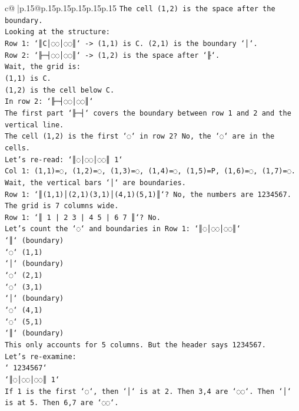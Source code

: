 \documentclass{article}
\begin{document}
{\begin{supertabular}{c@{$\;$}|p{.15\linewidth}@{}p{.15\linewidth}p{.15\linewidth}p{.15\linewidth}p{.15\linewidth}p{.15\linewidth}}
{{{\texttt{The cell (1,2) is the space after the boundary.} \\
\texttt{Looking at the structure:} \\
\texttt{Row 1: `║C│◌◌│◌◌║` {-}> (1,1) is C. (2,1) is the boundary `│`.} \\
\texttt{Row 2: `╟─┤◌◌│◌◌║` {-}> (1,2) is the space after `╟`.} \\
\texttt{Wait, the grid is:} \\
\texttt{(1,1) is C.} \\
\texttt{(1,2) is the cell below C.} \\
\texttt{In row 2: `╟─┤◌◌│◌◌║`} \\
\texttt{The first part `╟─┤` covers the boundary between row 1 and 2 and the vertical line.} \\
\texttt{The cell (1,2) is the first `◌` in row 2? No, the `◌` are in the cells.} \\
\texttt{Let's re{-}read: `║◌│◌◌│◌◌║ 1`} \\
\texttt{Col 1: (1,1)=◌, (1,2)=◌, (1,3)=◌, (1,4)=◌, (1,5)=P, (1,6)=◌, (1,7)=◌.} \\
\texttt{Wait, the vertical bars `│` are boundaries.} \\
\texttt{Row 1: `║(1,1)│(2,1)(3,1)│(4,1)(5,1)║`? No, the numbers are 1234567.} \\
\texttt{The grid is 7 columns wide.} \\
\texttt{Row 1: `║ 1 | 2 3 | 4 5 | 6 7 ║`? No.} \\
\texttt{Let's count the `◌` and boundaries in Row 1: `║◌│◌◌│◌◌║`} \\
\texttt{`║` (boundary)} \\
\texttt{`◌` (1,1)} \\
\texttt{`│` (boundary)} \\
\texttt{`◌` (2,1)} \\
\texttt{`◌` (3,1)} \\
\texttt{`│` (boundary)} \\
\texttt{`◌` (4,1)} \\
\texttt{`◌` (5,1)} \\
\texttt{`║` (boundary)} \\
\texttt{This only accounts for 5 columns. But the header says 1234567.} \\
\texttt{Let's re{-}examine:} \\
\texttt{` 1234567`} \\
\texttt{`║◌│◌◌│◌◌║ 1`} \\
\texttt{If 1 is the first `◌`, then `│` is at 2. Then 3,4 are `◌◌`. Then `│` is at 5. Then 6,7 are `◌◌`.} \\
}}}
\end{supertabular}}
\end{document}

